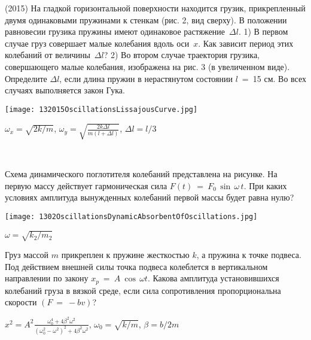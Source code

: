 \begin{ex}
(2015) На гладкой горизонтальной поверхности находится грузик, прикрепленный двумя одинаковыми пружинами к стенкам (рис. 2, вид сверху). 
В положении равновесии грузика пружины имеют одинаковое растяжение~$\Delta l$. 1) В первом случае груз совершает малые колебания вдоль оси~$x$. 
Как зависит период этих колебаний от величины~$\Delta l$?   2) Во втором случае траектория грузика, совершающего малые колебания, изображена на рис. 3 (в увеличенном виде).
Определите $\Delta l$, если длина пружин в нерастянутом состоянии $l$~=~15 см. Во всех случаях выполняется закон Гука.
\begin{center}
\texttt{[image: 132015OscillationsLissajousCurve.jpg]}
\end{center}
\begin{ans}
$\omega_x = \sqrt{2k/m}$, $\omega_y=\sqrt{\frac{2k\Delta l}{m(l+\Delta l)}}$, $\Delta l = l/3$
\end{ans}
\end{ex}

\begin{ex}
\hspace{0pt} \\
\begin{minipage}{.65\textwidth}
Схема динамического поглотителя колебаний представлена на рисунке. На первую массу действует гармоническая сила $F(t)~=~F_0\,\sin\,\omega\,t$. 
При каких условиях амплитуда вынужденных колебаний первой массы будет равна нулю?
\end{minipage}
\begin{minipage}{.35\textwidth}
\centering
\texttt{[image: 1302OscillationsDynamicAbsorbentOfOscillations.jpg]}
\end{minipage}
\begin{ans}
$\omega = \sqrt{k_2/m_2}$
\end{ans}
\end{ex}

\begin{ex}
Груз массой $m$ прикреплен к пружине жесткостью $k$, а пружина к точке подвеса. 
Под действием внешней силы точка подвеса колеблется в вертикальном направлении по закону $x_p~=~A~\cos\,\omega t$. 
Какова амплитуда установившихся колебаний груза в вязкой среде, если сила сопротивления пропорциональна скорости $(F~=~-bv)$?
\begin{ans}
$x^2 = A^2\frac{\omega_0^4+4\beta^2\omega^2}{(\omega_0^2-\omega^2)^2+4\beta^2\omega^2}$, $\omega_0 = \sqrt{k/m}$, $\beta = b/2m$
\end{ans}
\end{ex}

